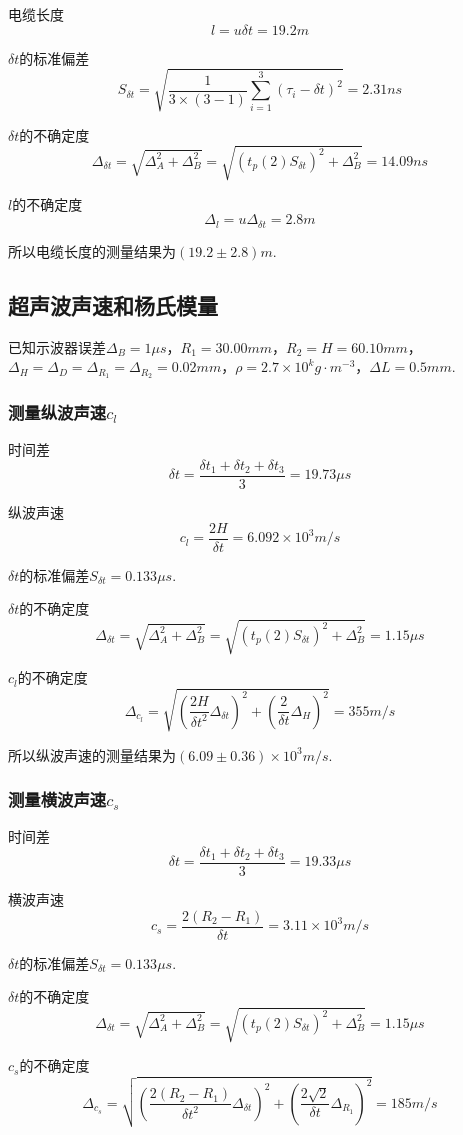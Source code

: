 \documentclass{thureport}
\begin{document}
电缆长度
$$l=u\delta t=19.2m$$

$\delta t$的标准偏差
$$S_{\delta t}=\sqrt{\frac{1}{3\times(3-1)}\sum_{i=1}^3(\tau_i-\delta t)^2}=2.31ns$$

$\delta t$的不确定度
$$\Delta_{\delta t}=\sqrt{\Delta_A^2+\Delta_B^2}=\sqrt{(t_p(2)S_{\delta t})^2+\Delta_B^2}=14.09ns$$

$l$的不确定度
$$\Delta_l=u\Delta_{\delta t}=2.8m$$

所以电缆长度的测量结果为$(19.2\pm 2.8)m$.

\subsection{超声波声速和杨氏模量}
已知示波器误差$\Delta_B=1\mu s$，$R_1=30.00mm$，$R_2=H=60.10mm$，$\Delta_H=\Delta_D=\Delta_{R_1}=\Delta_{R_2}=0.02mm$，$\rho=2.7\times10^kg\cdot m^{-3}$，$\Delta L=0.5mm$.

\subsubsection{测量纵波声速$c_l$}
时间差
$$\delta t=\frac{\delta t_1+\delta t_2+\delta t_3}{3}=19.73\mu s$$

纵波声速
$$c_l=\frac{2H}{\delta t}=6.092\times10^3m/s$$

$\delta t$的标准偏差$S_{\delta t}=0.133\mu s$.

$\delta t$的不确定度
$$\Delta_{\delta t}=\sqrt{\Delta_A^2+\Delta_B^2}=\sqrt{(t_p(2)S_{\delta t})^2+\Delta_B^2}=1.15\mu s$$

$c_l$的不确定度
$$\Delta_{c_l}=\sqrt{(\frac{2H}{\delta t^2}\Delta_{\delta t})^2+(\frac{2}{\delta t}\Delta_H)^2}=355m/s$$

所以纵波声速的测量结果为$(6.09\pm0.36)\times10^3m/s$.

\subsubsection{测量横波声速$c_s$}
时间差
$$\delta t=\frac{\delta t_1+\delta t_2+\delta t_3}{3}=19.33\mu s$$

横波声速
$$c_s=\frac{2(R_2-R_1)}{\delta t}=3.11\times10^3m/s$$

$\delta t$的标准偏差$S_{\delta t}=0.133\mu s$.

$\delta t$的不确定度
$$\Delta_{\delta t}=\sqrt{\Delta_A^2+\Delta_B^2}=\sqrt{(t_p(2)S_{\delta t})^2+\Delta_B^2}=1.15\mu s$$

$c_s$的不确定度
$$\Delta_{c_s}=\sqrt{(\frac{2(R_2-R_1)}{\delta t^2}\Delta_{\delta t})^2+(\frac{2\sqrt{2}}{\delta t}\Delta_{R_1})^2}=185m/s$$
\end{document}
